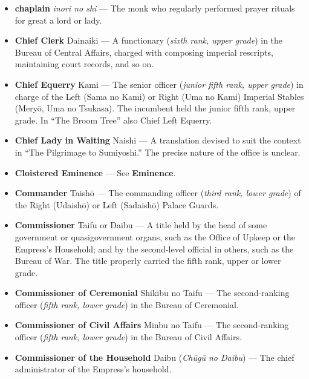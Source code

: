 \documentclass{article}
\begin{document}
\begin{multicols}{2}
\begin{small}
\begin{itemize}[
				label=,
				leftmargin=0em,
				rightmargin=-1.5em,
				itemindent=-2em,
			]
			\item \textbf{chaplain} \textit{inori no shi} --- The monk who regularly performed prayer rituals for great a lord or lady.

			\item \textbf{Chief Clerk} Dainaiki --- A functionary (\textit{sixth rank, upper grade}) in the Bureau of Central Affairs, charged with composing imperial rescripts, maintaining court records, and so on.

			\item \textbf{Chief Equerry} Kami --- The senior officer (\textit{junior fifth rank, upper grade}) in charge of the Left (Sama no Kami) or Right (Uma no Kami) Imperial Stables (Meryō, Uma no Tsukasa). The incumbent held the junior fifth rank, upper grade. In “The Broom Tree” also Chief Left Equerry.

			\item \textbf{Chief Lady in Waiting} Naishi --- A translation devised to suit the context in “The Pilgrimage to Sumiyoshi.” The precise nature of the office is unclear.

			\item \textbf{Cloistered Eminence} --- See \textbf{Eminence}.

			\item \textbf{Commander} Taishō --- The commanding officer (\textit{third rank, lower grade}) of the Right (Udaishō) or Left (Sadaishō) Palace Guards.

			\item \textbf{Commissioner} Taifu or Daibu --- A title held by the head of some government or quasigovernment organs, such as the Office of Upkeep or the Empress's Household; and by the second-level official in others, such as the Bureau of War. The title properly carried the fifth rank, upper or lower grade.

			\item \textbf{Commissioner of Ceremonial} Shikibu no Taifu --- The second-ranking officer (\textit{fifth rank, lower grade}) in the Bureau of Ceremonial.

			\item \textbf{Commissioner of Civil Affairs} Minbu no Taifu --- The second-ranking officer (\textit{fifth rank, lower grade}) in the Bureau of Civil Affairs.

			\item \textbf{Commissioner of the Household} Daibu (\textit{Chūgū no Daibu}) --- The chief administrator of the Empress's household.


\end{itemize}
\end{small}
\end{multicols}
\end{document}
